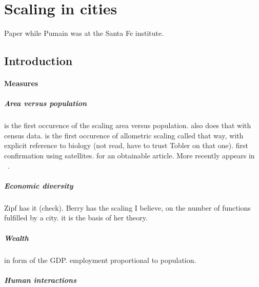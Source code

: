 %
\chapter{Scaling in cities}
\label{sec:scaling_in_cities}

\cite{Pumain:2004} Paper while Pumain was at the Santa Fe institute.

\section{Introduction}
\label{sec:introduction}

    \subsubsection{Measures}
    \label{ssub:measures}

\paragraph{Area versus population} \cite{Stewart:1958} is the first occurence of
the scaling area versus population. \cite{Boyce:1963} also does that with census
data. \cite{Nordbeck:1965} is the first occurence
of allometric scaling called that way, with explicit reference to biology (not
read, have to trust Tobler on that one).
\cite{Tobler:1969} first confirmation using satellites. \cite{Nordbeck:1971} for
an obtainable article. More recently appears in ~\cite{Guerois:2003}.

\paragraph{Economic diversity} \cite{Zipf:1949} Zipf has it (check). \cite{Berry:1967} Berry has the scaling I
believe, on the number of functions fulfilled by a city. \cite{Pumain:2006} it
is the basis of her theory. \cite{Bettencourt:2014}

\paragraph{Wealth} \cite{Bettencourt:2007} in form of the GDP.
\cite{Bettencourt:2014} employment proportional to population.

\paragraph{Human interactions} \cite{Schlapfer:2014}

